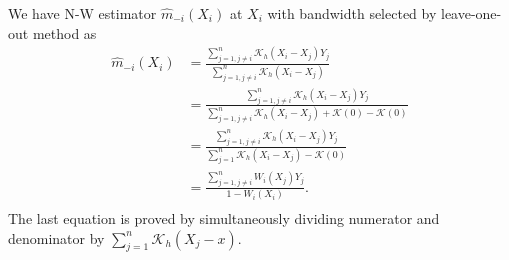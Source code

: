 \begin{solution}
    We have N-W estimator $\hat{m}_{-i}\left(X_{i}\right)$ at $X_i$ with bandwidth selected by leave-one-out method as
    \begin{equation*}
        \begin{split}
            \hat{m}_{-i}\left(X_{i}\right)
            & = \frac{\sum_{j=1, j \neq i}^{n} \mathcal{K}_{h}\left(X_{i}-X_{j}\right)Y_j}{\sum_{j=1, j \neq i}^{n} \mathcal{K}_{h}\left(X_{i}-X_{j}\right)} \\
            & = \frac{\sum_{j=1, j \neq i}^{n} \mathcal{K}_{h}\left(X_{i}-X_{j}\right)Y_j}{\sum_{j=1, j \neq i}^{n} \mathcal{K}_{h}\left(X_{i}-X_{j}\right) + \mathcal{K}(0) - \mathcal{K}(0)} \\
            & = \frac{\sum_{j=1, j \neq i}^{n} \mathcal{K}_{h}\left(X_{i}-X_{j}\right)Y_j}{\sum_{j=1}^{n} \mathcal{K}_{h}\left(X_{i}-X_{j}\right)- \mathcal{K}(0)} \\
            & = \frac{\sum_{j=1, j \neq i}^{n} W_i(X_j)Y_j}{1-W_i(X_i)}. \\
        \end{split}
    \end{equation*}
    The last equation is proved by simultaneously dividing numerator and denominator by $\sum_{j=1}^n \mathcal{K}_h(X_j-x)$.


\end{solution}
